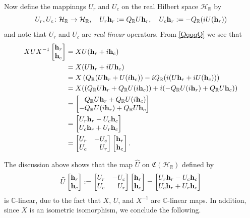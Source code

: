 \documentclass{dis}
\newcommand{\phm}{\phantom{-}}
\theoremstyle{plain}
\theoremstyle{definition}
\def\C{\mathbb{C}}
\def\R{\mathbb{R}}
\newcommand{\h}{\mathcal{H}}
\newcommand{\U}{\mathbf{U}}
\renewcommand{\vec}[1]{{\bf #1}}
\newcommand{\0}{{\color{lightgray}0}}
\begin{document}
Now define the mappinngs $U_r$ and $U_c$ on the real Hilbert space $\mathcal{H}_{\R}$ by 
\begin{equation}\label{QQQQRRRRrrR}
U_r,U_c\colon \h_\R\to\h_\R, \quad  U_r \vec{h}_r := Q_\R U \vec{h}_r, \quad   U_c \vec{h}_r :=-Q_\R( i U (\vec{h}_r))
\end{equation}
 and note that $U_r$ and $U_c$ are {\em real linear} operators.
From \eqref{QqqqQ} we see that
\begin{align*}
XUX^{-1}\begin{bmatrix}\vec{h}_r\\\vec{h}_c\end{bmatrix} &=XU(\vec{h}_r+i \vec{h}_c)\\
&=X(U \vec{h}_r+iU \vec{h}_c)\\
&=X\left(Q_\R(U \vec{h}_r+U(i \vec{h}_c))-iQ_\R(i(U \vec{h}_r+iU( \vec{h}_c))\right)\\
&=X((Q_\R U\vec{h}_r+Q_\R U(i \vec{h}_c))+i(-Q_\R U(i \vec{h}_r)+Q_\R  U \vec{h}_c))\\
&=
\begin{bmatrix}\phm Q_\R U \vec{h}_r+Q_\R U(i \vec{h}_c)\\ -Q_\R U(i \vec{h}_r)+Q_\R U \vec{h}_c\end{bmatrix}\\
& = \begin{bmatrix}U_r \vec{h}_r - U_{c} \vec{h}_c\\U_{c} \vec{h}_r + U_{r} \vec{h}_{c}\end{bmatrix}\\
& =
\begin{bmatrix}
U_r & - U_c\\
U_c & \phm U_r
\end{bmatrix}
\begin{bmatrix}
\vec{h}_r\\
\vec{h}_c
\end{bmatrix}.
\end{align*}

The discussion above shows that the map $\widehat{U}$ on $\mathfrak{C}(\mathcal{H}_{\R})$ defined by 
$$\widehat{U} \begin{bmatrix}
\vec{h}_r\\
\vec{h}_c
\end{bmatrix} := \begin{bmatrix}
U_r & - U_c\\
U_c & \phm U_r
\end{bmatrix}
\begin{bmatrix}
\vec{h}_r\\
\vec{h}_c
\end{bmatrix} =  \begin{bmatrix}U_r \vec{h}_r - U_{c} \vec{h}_c\\ U_{c} \vec{h}_r + U_{r} \vec{h}_{c}\end{bmatrix}$$
is  $\C$-linear, due to the fact that $X$, $U$, and $X^{-1}$ are $\C$-linear maps. In addition, since $X$ is an isometric isomorphism, we conclude the following. 
\end{document}
